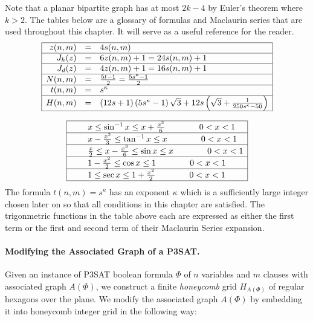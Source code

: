 \documentclass[10pt]{CSUNthesis}
\theoremstyle{plain}%
\theoremstyle{definition}
\theoremstyle{remark}
\newcommand{\lr}[1]{\left( #1 \right)}
\begin{document}
Note that a planar bipartite graph has at most $2k-4$ by Euler's theorem where $k>2$.  
The tables below are a glossary of formulas and Maclaurin series that are used throughout this chapter.
It will serve as a useful reference for the reader.
$$
\begin{array}{|rcl|}
\hline
z(n,m)		&=& 4 s(n,m)\\\hline
J_h (z) 	&=& 6z(n,m)+1 = 24s(n,m)+1 \\\hline
J_d (z) 	&=& 4z(n,m)+1												= 16s(n,m)+1  			\\\hline
N(n,m)		&=& \frac{5t-1}{2}											= \frac{5s^\kappa-1}{2}	\\\hline
t(n,m)		&=& s^\kappa																		\\\hline
H(n,m) 		&=&  (12s+1)  \lr{5s^\kappa -1}  \sqrt{3} + 12s \lr{\sqrt{3}+ \frac{1}{250s^\kappa -50}}				\\\hline
\end{array}
$$


$$
\begin{array}{|rcl|}
\hline
&& x 				\leq \sin^{-1} x \leq x + \frac{x^3}{6} \qquad\qquad 0< x <1 \\\hline
&& x - \frac{x^3}{3}\leq \tan^{-1} x \leq x 				\qquad\qquad 0< x < 1\\\hline
&& \frac{x}{2}\leq x - \frac{x^3}{6}\leq \sin x 	 \leq x 				\qquad\qquad 0< x < 1\\\hline
&& 1 - \frac{x^2}{2}\leq \cos x 	 \leq 1 				\qquad\qquad 0< x < 1\\\hline
&& 1 				\leq \sec x 	 \leq 1 + \frac{x^2}{2} \qquad\qquad 0< x < 1\\\hline
\end{array}
$$
The formula $t(n,m)=s^\kappa$ has an exponent $\kappa$ which is a sufficiently large integer chosen later on so that all conditions in this chapter are satisfied.
The trigonmetric functions in the table above each are expressed as either the first term or the first and second term of their Maclaurin Series expansion.

\paragraph{Modifying the Associated Graph of a P3SAT.}

Given an instance of P3SAT boolean formula $\Phi$ of $n$ variables and $m$ clauses with associated graph $A(\Phi)$, we construct a finite \textit{honeycomb} grid $H_{A \lr{\Phi}}$ of regular hexagons over the plane.
We modify the associated graph $A\lr{\Phi}$ by embedding it into honeycomb integer grid in the following way:
\end{document}
